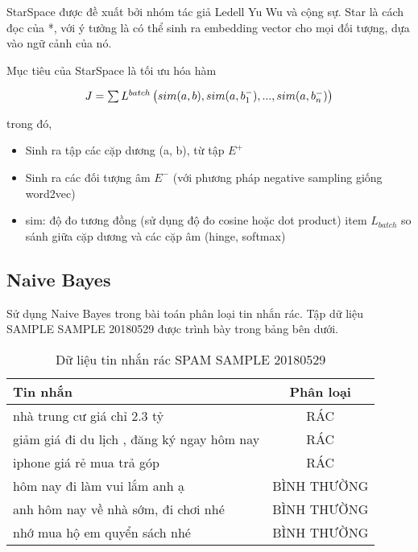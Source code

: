 \documentclass[11pt,a4paper]{article}
\begin{document}
StarSpace được đề xuất bởi nhóm tác giả Ledell Yu Wu và cộng sự. Star là cách đọc của *, với ý tưởng là có thể sinh ra embedding vector cho mọi đối tượng, dựa vào ngữ cảnh của nó.

Mục tiêu của StarSpace là tối ưu hóa hàm

\begin{equation}
$$J = \sum L^{batch} \left( sim(a, b), sim(a, b_1^{-}),..., sim(a, b_n^{-}) \right)$$
\end{equation}

trong đó,

\begin{itemize}
  \item Sinh ra tập các cặp dương (a, b), từ tập $E^{+}$
  \item Sinh ra các đối tượng âm $E^{-}$ (với phương pháp negative sampling giống word2vec)
  \item sim: độ đo tương đồng (sử dụng độ đo cosine hoặc dot product)
  item $L_{batch}$ so sánh giữa cặp dương và các cặp âm (hinge, softmax)
\end{itemize}




\clearpage

\begin{appendices}
\section{Naive Bayes}
Sử dụng Naive Bayes trong bài toán phân loại tin nhắn rác. Tập dữ liệu SAMPLE SAMPLE 20180529 được trình bày trong bảng bên dưới.

\begin{table}
  \centering
  \begin{tabular}{lc}
    \toprule
    Tin nhắn & Phân loại \\
    \midrule
    nhà trung cư giá chỉ 2.3 tỷ & RÁC \\
    giảm giá đi du lịch , đăng ký ngay hôm nay & RÁC \\
    iphone giá rẻ mua trả góp & RÁC \\
    hôm nay đi làm vui lắm anh ạ & BÌNH THƯỜNG \\
		anh hôm nay về nhà sớm, đi chơi nhé & BÌNH THƯỜNG \\
		nhớ mua hộ em quyển sách nhé & BÌNH THƯỜNG
    \bottomrule
  \end{tabular}

  \label{data:spam_sample}
  \caption{\small Dữ liệu tin nhắn rác SPAM SAMPLE 20180529}
\end{table}



\end{appendices}
\end{document}
